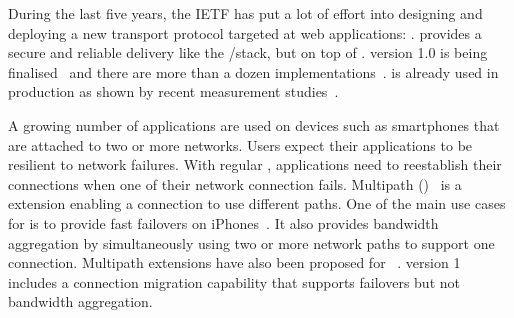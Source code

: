 During the last five years, the IETF has put a lot of effort
into designing and deploying a new transport protocol targeted at web
applications: \quic \cite{langley2017quic}. \quic provides a secure and
reliable delivery like the \tls/\tcp stack, but on top of \udp.
\quic
version 1.0 is being finalised~\cite{draft-ietf-quic-transport} and there are
more than a dozen implementations~\cite{quicimplem,marx2020same}. \quic is
already used in production as shown by recent measurement
studies~\cite{trevisan2020five}.

A growing number of applications are used on devices such as smartphones that
are attached to two or more networks. Users expect their applications to be
resilient to network failures.  With regular \tcp, applications need to
reestablish their connections when one of their network connection fails.
Multipath \tcp (\mptcp)~\cite{rfc8684,raiciu2012hard} is a \tcp extension
enabling a connection to use different paths. One of the main use cases for
\mptcp is to provide fast failovers on iPhones~\cite{bonaventure2016multipath}.
It also provides bandwidth aggregation by simultaneously using two or more
network paths to support one connection. Multipath extensions have also been
proposed for \quic~\cite{viernickel2018multipath,de2017multipath}. \quic version
1~\cite{draft-ietf-quic-transport} includes a connection migration capability
that supports failovers but not bandwidth aggregation.

